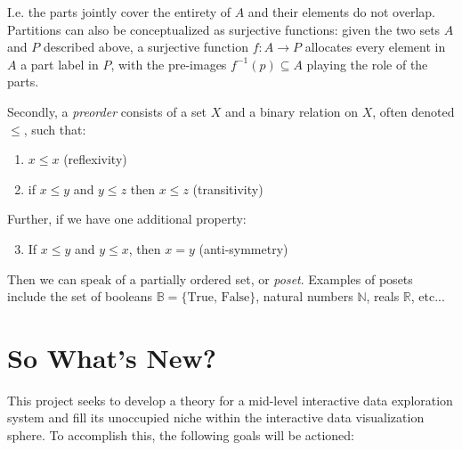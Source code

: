 \documentclass[12pt,a4paper]{article}
\begin{document}
I.e. the parts jointly cover the entirety of $A$ and their elements do not overlap. Partitions can also be conceptualized as surjective functions: given the two sets $A$ and $P$ described above, a surjective function $f : A \to P$ allocates every element in $A$ a part label in $P$, with the pre-images $f^{-1}(p) \subseteq A$ playing the role of the parts.  

Secondly, a \textit{preorder} consists of a set $X$ and a binary relation on $X$, often denoted $\leq$, such that:

\begin{enumerate}
\item $x \leq x$ (reflexivity)
\item if $x \leq y$ and $y \leq z$ then $x \leq z$ (transitivity)
\end{enumerate}

Further, if we have one additional property:

\begin{enumerate}
\setcounter{enumi}{2}
\item If $x \leq y$ and $y \leq x$, then $x = y$ (anti-symmetry)
\end{enumerate}

Then we can speak of a partially ordered set, or \textit{poset}. Examples of posets include the set of booleans $\mathbb{B} = \{ \text{True, False} \}$, natural numbers $\mathbb{N}$, reals $\mathbb{R}$, etc... 

\section{So What's New?}
\label{sec:whatsnew}

This project seeks to develop a theory for a mid-level interactive data exploration system and fill its unoccupied niche within the interactive data visualization sphere. To accomplish this, the following goals will be actioned:  
\end{document}
